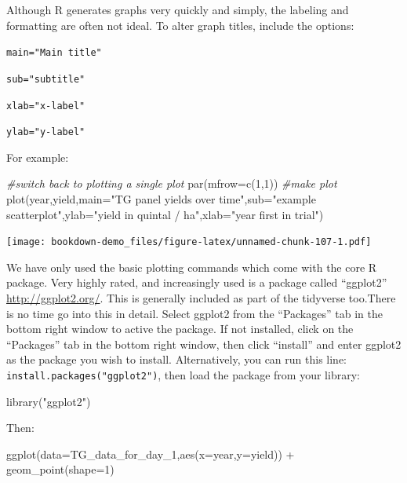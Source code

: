 \documentclass[
]{book}
\newenvironment{Shaded}{\begin{snugshade}}{\end{snugshade}}
\newcommand{\AttributeTok}[1]{\textcolor[rgb]{0.77,0.63,0.00}{#1}}
\newcommand{\CommentTok}[1]{\textcolor[rgb]{0.56,0.35,0.01}{\textit{#1}}}
\newcommand{\DecValTok}[1]{\textcolor[rgb]{0.00,0.00,0.81}{#1}}
\newcommand{\FunctionTok}[1]{\textcolor[rgb]{0.00,0.00,0.00}{#1}}
\newcommand{\NormalTok}[1]{#1}
\newcommand{\SpecialCharTok}[1]{\textcolor[rgb]{0.00,0.00,0.00}{#1}}
\newcommand{\StringTok}[1]{\textcolor[rgb]{0.31,0.60,0.02}{#1}}
\begin{document}
Although R generates graphs very quickly and simply, the labeling and formatting are often not ideal. To alter graph titles, include the options:

\texttt{main="Main\ title"}

\texttt{sub="subtitle"}

\texttt{xlab="x-label"}

\texttt{ylab="y-label"}

For example:

\begin{Shaded}
\begin{Highlighting}[]
\CommentTok{\#switch back to plotting a single plot}
\FunctionTok{par}\NormalTok{(}\AttributeTok{mfrow=}\FunctionTok{c}\NormalTok{(}\DecValTok{1}\NormalTok{,}\DecValTok{1}\NormalTok{))}
\CommentTok{\#make plot}
\FunctionTok{plot}\NormalTok{(year,yield,}\AttributeTok{main=}\StringTok{"TG panel yields over time"}\NormalTok{,}\AttributeTok{sub=}\StringTok{"example scatterplot"}\NormalTok{,}\AttributeTok{ylab=}\StringTok{"yield in quintal / ha"}\NormalTok{,}\AttributeTok{xlab=}\StringTok{"year first in trial"}\NormalTok{)}
\end{Highlighting}
\end{Shaded}

\texttt{[image: bookdown-demo\_files/figure-latex/unnamed-chunk-107-1.pdf]}

We have only used the basic plotting commands which come with the core R package. Very highly rated, and increasingly used is a package called ``ggplot2'' \url{http://ggplot2.org/}. This is generally included as part of the tidyverse too.There is no time go into this in detail. Select ggplot2 from the ``Packages'' tab in the bottom right window to active the package. If not installed, click on the ``Packages'' tab in the bottom right window, then click ``install'' and enter ggplot2 as the package you wish to install. Alternatively, you can run this line: \texttt{install.packages("ggplot2")}, then load the package from your library:

\begin{Shaded}
\begin{Highlighting}[]
\FunctionTok{library}\NormalTok{(}\StringTok{"ggplot2"}\NormalTok{)}
\end{Highlighting}
\end{Shaded}

Then:

\begin{Shaded}
\begin{Highlighting}[]
\FunctionTok{ggplot}\NormalTok{(}\AttributeTok{data=}\NormalTok{TG\_data\_for\_day\_1,}\FunctionTok{aes}\NormalTok{(}\AttributeTok{x=}\NormalTok{year,}\AttributeTok{y=}\NormalTok{yield)) }\SpecialCharTok{+} \FunctionTok{geom\_point}\NormalTok{(}\AttributeTok{shape=}\DecValTok{1}\NormalTok{)}
\end{Highlighting}
\end{Shaded}
\end{document}
